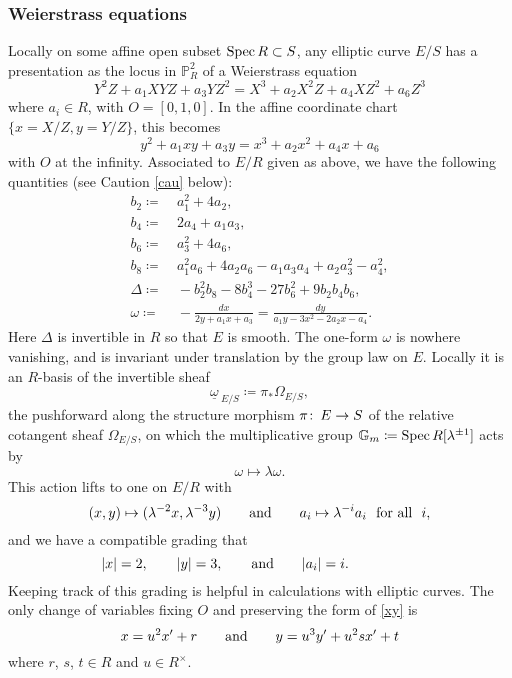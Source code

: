 \documentclass{gtpart}
\theoremstyle{definition}
\theoremstyle{remark}
\def\co{\colon\thinspace}
\newcommand{\mb}[1]{\mathbb{#1}}
\newcommand{\Spec}{{\rm Spec\thinspace}}
\newcommand{\Gm}{{{\mb G}_m}}
\newcommand{\BP}{{\mb P}}
\newcommand{\ad}{{\rm and}}
\newcommand{\om}{\underline{\omega\!}_{~E/S}}
\newcommand{\ce}{\coloneqq}
\numberwithin{equation}{section}
\numberwithin{thm}{section}
\begin{document}
\subsubsection*{Weierstrass equations}

Locally on some affine open subset $\Spec R \subset S$, any elliptic 
curve $E/S$ has a presentation as the locus in $\BP_R^2$ of a 
Weierstrass equation 
\begin{equation}
\label{XYZ}
 Y^2 Z + a_1 X Y Z + a_3 Y Z^2 = X^3 + a_2 X^2 Z + a_4 X Z^2 + a_6 Z^3 
\end{equation}
where $a_i \in R$, with $O = [0,1,0]$.  In the affine coordinate chart 
$\{x = X/Z, y = Y/Z\}$, this becomes 
\begin{equation}
\label{xy}
 y^2 + a_1 x y + a_3 y = x^3 + a_2 x^2 + a_4 x + a_6 
\end{equation}
with $O$ at the infinity.  Associated to $E/R$ given as above, we have 
the following quantities (see Caution \ref{cau} below): 
\begin{equation}
\label{quantities}
\begin{split}
 b_2 \ce & ~ a_1^2 + 4 a_2, \\
 b_4 \ce & ~ 2 a_4 + a_1 a_3, \\
 b_6 \ce & ~ a_3^2 + 4 a_6, \\
 b_8 \ce & ~ a_1^2 a_6 + 4 a_2 a_6 - a_1 a_3 a_4 + a_2 a_3^2 - a_4^2, \\
 \Delta \ce & ~ -b_2^2 b_8 - 8 b_4^3 - 27 b_6^2 + 9 b_2 b_4 b_6, \\
 \omega \ce & ~ -\frac{dx}{2 y + a_1 x + a_3} = \frac{dy}{a_1 y - 3 x^2 - 2 a_2 x - a_4}.  
\end{split}
\end{equation}
Here $\Delta$ is invertible in $R$ so that $E$ is smooth.  The one-form 
$\omega$ is nowhere vanishing, and is invariant under translation by the 
group law on $E$.  Locally it is an $R$-basis of the invertible sheaf 
\[
 \om \ce \pi_* \Omega_{E/S}, 
\]
the pushforward along the structure morphism $\pi \co E \to S$ of the 
relative cotangent sheaf $\Omega_{E/S}$, on which the multiplicative 
group $\Gm \ce \Spec R[\lambda^{\pm1}]$ acts by 
\begin{equation}
\label{action}
 \omega \longmapsto \lambda \omega.  
\end{equation}
This action lifts to one on $E/R$ with 
\[
 (x,y) \mapsto (\lambda^{-2} x,\lambda^{-3} y) \qquad \ad \qquad 
 a_i \mapsto \lambda^{-i} a_i \text{~ for all ~} i, 
\]
and we have a compatible grading that 
\[
 |x| = 2, \qquad |y| = 3, \qquad \ad \qquad |a_i| = i.  \qquad \qquad 
 \quad
\]
Keeping track of this grading is helpful in calculations with elliptic 
curves.  The only change of variables fixing $O$ and preserving the form 
of \eqref{xy} is 
\[
 x = u^2 x' + r \qquad \ad \qquad y = u^3 y' + u^2 s x' + t 
\]
where $r$, $s$, $t \in R$ and $u \in R^\times$.  
\end{document}
